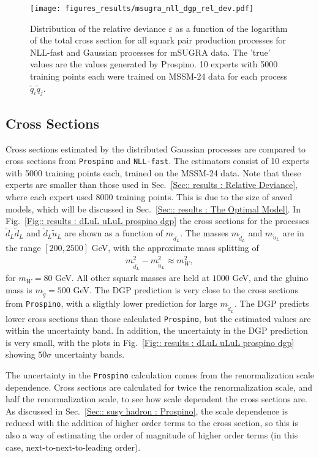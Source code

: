 \documentclass[twoside,english]{uiofysmaster}
\begin{document}
\begin{figure}
\centering
\texttt{[image: figures\_results/msugra\_nll\_dgp\_rel\_dev.pdf]}
\caption{Distribution of the relative deviance $\varepsilon$ as a function of the logarithm of the total cross section for all squark pair production processes for NLL-fast and Gaussian processes for mSUGRA data. The 'true' values are the values generated by Prospino. 10 experts with 5000 training points each were trained on MSSM-24 data for each process $\tilde{q}_i \tilde{q}_j$.}
\label{Fig:: results : RD CMSSM}
\end{figure}

\subsection{Cross Sections}

Cross sections estimated by the distributed Gaussian processes are  compared to cross sections from \verb|Prospino| and \verb|NLL-fast|. The estimators consist of 10 experts with 5000 training points each, trained on the MSSM-24 data. Note that these experts are smaller than those used in Sec.~\ref{Sec:: results : Relative Deviance}, where each expert used 8000 training points. This is due to the size of saved models, which will be discussed in Sec.~\ref{Sec:: results : The Optimal Model}. In Fig.~\ref{Fig:: results : dLuL uLuL prospino dgp} the cross sections for the processes $\tilde{d}_L \tilde{d}_L$ and $\tilde{d}_L \tilde{u}_L$ are shown as a function of $m_{\tilde{d}_L}$. The masses $m_{\tilde{d}_L}$ and $m_{\tilde{u}_L}$ are in the range $[200, 2500]$ GeV, with the approximate mass splitting of
\begin{align}
m_{\tilde{d}_L}^2 - m_{\tilde{u}_L}^2 \approx m_W^2,
\end{align}
for $m_W = 80$ GeV. All other squark masses are held at $1000$ GeV, and the gluino mass is $m_{\tilde{g}} = 500$ GeV. The DGP prediction is very close to the cross sections from \verb|Prospino|, with a sligthly lower prediction for large $m_{\tilde{d}_L}$. The DGP predicts lower cross sections than those calculated \verb|Prospino|, but the estimated values are within the uncertainty band. In addition, the uncertainty in the DGP prediction is very small, with the plots in Fig.~\ref{Fig:: results : dLuL uLuL prospino dgp} showing $50 \sigma$ uncertainty bands.

The uncertainty in the \verb|Prospino| calculation comes from the renormalization scale dependence. Cross sections are calculated for twice the renormalization scale, and half the renormalization scale, to see how scale dependent the cross sections are. As discussed in Sec.~\ref{Sec:: susy hadron : Prospino}, the scale dependence is reduced with the addition of higher order terms to the cross section, so this is also a way of estimating the order of magnitude of higher order terms (in this case, next-to-next-to-leading order).
\end{document}
